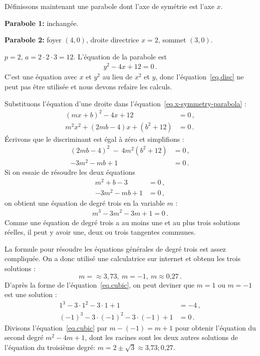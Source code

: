 \begin{example}\mbox{}

\noindent Définissons maintenant une parabole dont l'axe de symétrie est l'axe $x$.

\noindent\textbf{Parabole 1:} inchangée.

\noindent\textbf{Parabole 2:} foyer $(4,0)$, droite directrice $x=2$, sommet $(3,0)$.

\noindent{}$p=2$, $a=2\cdot 2\cdot 3=12$. L'équation de la parabole est 
\begin{align}
y^2-4x+12 = 0\,.\label{eq.x-symmetry-parabola}
\end{align}
C'est une équation avec $x$ et $y^2$ au lieu de $x^2$ et $y$, donc l'équation~\ref{eq.disc} ne peut pas être utilisée et nous devons refaire les calculs.

Substituons l'équation d'une droite dans l'équation~\ref{eq.x-symmetry-parabola} :
\begin{align*}
(mx+b)^2-4x+12&=0\,,\\
m^2x^2+(2mb-4)x+(b^2+12)&=0\,.
\end{align*}
\'Ecrivons que le discriminant est égal à zéro et simplifions :
\begin{align*}
(2mb-4)^2\:-\:4m^2(b^2+12)&=0\,,\\
-3m^2-mb+1&=0\,.
\end{align*}
Si on essaie de résoudre les deux équations 
\begin{align*}
m^2+b-3&=0\,,\\
-3m^2-mb+1&=0\,,
\end{align*}
on obtient une équation de degré trois en la variable $m$ :
\begin{align}
m^3-3m^2-3m+1=0\,.\label{eq.cubic}
\end{align}
Comme une équation de degré trois a au moins une et au plus trois solutions réelles, il peut y avoir une, deux ou trois tangentes communes.

La formule pour résoudre les équations générales de degré trois  est assez compliquée. On a donc utilisé une calculatrice sur internet et obtenu les trois solutions :
\[m=\approx{3,73},\:m=-1,\:m\approx\mbox{0,27}\,.\]
D'après la forme de l'équation~\ref{eq.cubic}, on peut deviner que $m=1$ ou $m=-1$ est une solution :
\begin{align*}
1^3-3\cdot 1^2-3\cdot 1+1&=-4\,,\\
(-1)^3-3\cdot (-1)^2-3\cdot(-1)+1&=0\,.
\end{align*}
Divisons l'équation~\ref{eq.cubic} par $m-(-1)=m+1$ pour obtenir l'équation du second degré $m^2-4m+1$,  dont les racines sont les deux autres solutions de l'équation du troisième degré:  $m=2\pm\sqrt{3}\approx \mbox{3,73}; \mbox{0,27}$.
\end{example}

